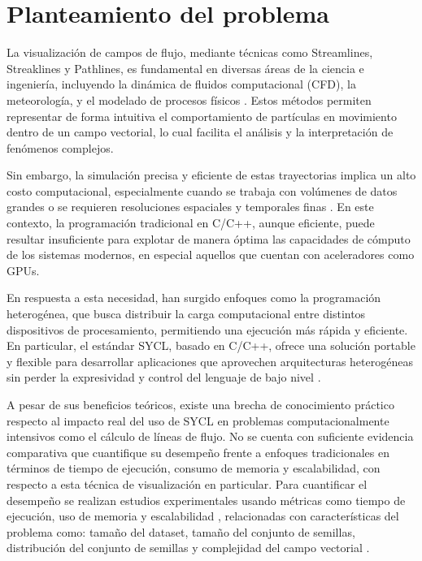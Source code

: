 \section{Planteamiento del problema}

La visualización de campos de flujo, mediante técnicas como Streamlines, Streaklines y Pathlines, es fundamental en diversas áreas de la ciencia e ingeniería, incluyendo la dinámica de fluidos computacional (CFD), la meteorología, y el modelado de procesos físicos \cite{camp_streamline_2011}. Estos métodos permiten representar de forma intuitiva el comportamiento de partículas en movimiento dentro de un campo vectorial, lo cual facilita el análisis y la interpretación de fenómenos complejos.



Sin embargo, la simulación precisa y eficiente de estas trayectorias implica un alto costo computacional, especialmente cuando se trabaja con volúmenes de datos grandes o se requieren resoluciones espaciales y temporales finas \cite{pugmire_scalable_2009}. En este contexto, la programación tradicional en C/C++, aunque eficiente, puede resultar insuficiente para explotar de manera óptima las capacidades de cómputo de los sistemas modernos, en especial aquellos que cuentan con aceleradores como GPUs.



En respuesta a esta necesidad, han surgido enfoques como la programación heterogénea, que busca distribuir la carga computacional entre distintos dispositivos de procesamiento, permitiendo una ejecución más rápida y eficiente. En particular, el estándar SYCL, basado en C/C++, ofrece una solución portable y flexible para desarrollar aplicaciones que aprovechen arquitecturas heterogéneas sin perder la expresividad y control del lenguaje de bajo nivel \cite{keryell_sycl_2019}.


A pesar de sus beneficios teóricos, existe una brecha de conocimiento práctico respecto al impacto real del uso de SYCL en problemas computacionalmente intensivos como el cálculo de líneas de flujo. No se cuenta con suficiente evidencia comparativa que cuantifique su desempeño frente a enfoques tradicionales en términos de tiempo de ejecución, consumo de memoria y escalabilidad, con respecto a esta técnica de visualización en particular. Para cuantificar el desempeño se realizan estudios experimentales usando métricas como tiempo de ejecución, uso de memoria y escalabilidad \cite{camp_gpu_2013}, relacionadas con características del problema como: tamaño del dataset, tamaño del conjunto de semillas, distribución del conjunto de semillas y complejidad del campo vectorial \cite{camp_streamline_2011}.
